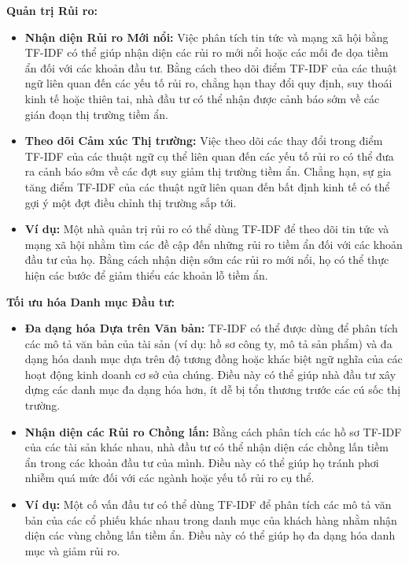 \textbf{Quản trị Rủi ro:}

\begin{itemize}
  \item \textbf{Nhận diện Rủi ro Mới nổi:} Việc phân tích tin tức và mạng xã hội bằng TF-IDF có thể giúp nhận diện các rủi ro mới nổi hoặc các mối đe dọa tiềm ẩn đối với các khoản đầu tư. Bằng cách theo dõi điểm TF-IDF của các thuật ngữ liên quan đến các yếu tố rủi ro, chẳng hạn thay đổi quy định, suy thoái kinh tế hoặc thiên tai, nhà đầu tư có thể nhận được cảnh báo sớm về các gián đoạn thị trường tiềm ẩn.
  \item \textbf{Theo dõi Cảm xúc Thị trường:} Việc theo dõi các thay đổi trong điểm TF-IDF của các thuật ngữ cụ thể liên quan đến các yếu tố rủi ro có thể đưa ra cảnh báo sớm về các đợt suy giảm thị trường tiềm ẩn. Chẳng hạn, sự gia tăng điểm TF-IDF của các thuật ngữ liên quan đến bất định kinh tế có thể gợi ý một đợt điều chỉnh thị trường sắp tới.
  \item \textbf{Ví dụ:} Một nhà quản trị rủi ro có thể dùng TF-IDF để theo dõi tin tức và mạng xã hội nhằm tìm các đề cập đến những rủi ro tiềm ẩn đối với các khoản đầu tư của họ. Bằng cách nhận diện sớm các rủi ro mới nổi, họ có thể thực hiện các bước để giảm thiểu các khoản lỗ tiềm ẩn.
\end{itemize}

\textbf{Tối ưu hóa Danh mục Đầu tư:}

\begin{itemize}
  \item \textbf{Đa dạng hóa Dựa trên Văn bản:} TF-IDF có thể được dùng để phân tích các mô tả văn bản của tài sản (ví dụ: hồ sơ công ty, mô tả sản phẩm) và đa dạng hóa danh mục dựa trên độ tương đồng hoặc khác biệt ngữ nghĩa của các hoạt động kinh doanh cơ sở của chúng. Điều này có thể giúp nhà đầu tư xây dựng các danh mục đa dạng hóa hơn, ít dễ bị tổn thương trước các cú sốc thị trường.
  \item \textbf{Nhận diện các Rủi ro Chồng lấn:} Bằng cách phân tích các hồ sơ TF-IDF của các tài sản khác nhau, nhà đầu tư có thể nhận diện các chồng lấn tiềm ẩn trong các khoản đầu tư của mình. Điều này có thể giúp họ tránh phơi nhiễm quá mức đối với các ngành hoặc yếu tố rủi ro cụ thể.
  \item \textbf{Ví dụ:} Một cố vấn đầu tư có thể dùng TF-IDF để phân tích các mô tả văn bản của các cổ phiếu khác nhau trong danh mục của khách hàng nhằm nhận diện các vùng chồng lấn tiềm ẩn. Điều này có thể giúp họ đa dạng hóa danh mục và giảm rủi ro.
\end{itemize}

